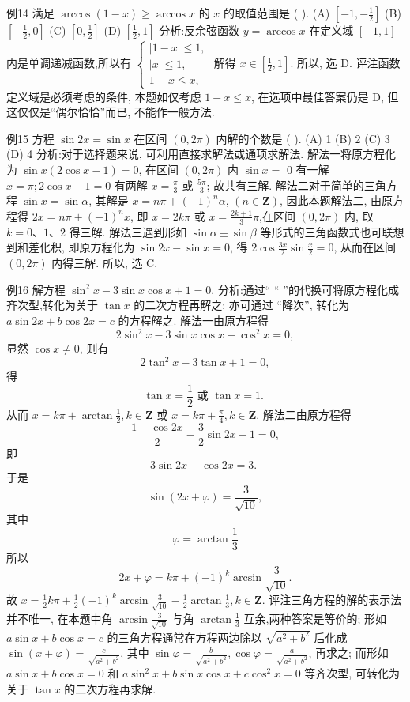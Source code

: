 例14 满足 $\arccos (1-x) \geqslant \arccos x$ 的 $x$ 的取值范围是 ( ).
(A) $\left[-1,-\frac{1}{2}\right]$
(B) $\left[-\frac{1}{2}, 0\right]$
(C) $\left[0, \frac{1}{2}\right]$
(D) $\left[\frac{1}{2}, 1\right]$
分析:反余弦函数 $y=\arccos x$ 在定义域 $[-1,1]$ 内是单调递减函数,所以有 $\left\{\begin{array}{l}|1-x| \leqslant 1, \\ |x| \leqslant 1, \\ 1-x \leqslant x,\end{array}\right.$ 解得 $x \in\left[\frac{1}{2}, 1\right]$.
所以, 选 D.
评注函数定义域是必须考虑的条件, 本题如仅考虑 $1-x \leqslant x$, 在选项中最佳答案仍是 $\mathrm{D}$, 但这仅仅是“偶尔恰恰”而已, 不能作一般方法.



例15 方程 $\sin 2 x=\sin x$ 在区间 $(0,2 \pi)$ 内解的个数是 ( ).
(A) 1
(B) 2
(C) 3
(D) 4
分析:对于选择题来说, 可利用直接求解法或通项求解法.
解法一将原方程化为 $\sin x(2 \cos x-1)=0$, 在区间 $(0,2 \pi)$ 内 $\sin x=$ 0 有一解 $x=\pi ; 2 \cos x-1=0$ 有两解 $x=\frac{\pi}{3}$ 或 $\frac{5 \pi}{3}$; 故共有三解.
解法二对于简单的三角方程 $\sin x=\sin \alpha$, 其解是 $x=n \pi+(-1)^n \alpha$, $(n \in \mathbf{Z})$, 因此本题解法二, 由原方程得 $2 x=n \pi+(-1)^n x$, 即 $x=2 k \pi$ 或 $x= \frac{2 k+1}{3} \pi$,在区间 $(0,2 \pi)$ 内, 取 $k=0 、 1 、 2$ 得三解.
解法三遇到形如 $\sin \alpha \pm \sin \beta$ 等形式的三角函数式也可联想到和差化积, 即原方程化为 $\sin 2 x-\sin x=0$, 得 $2 \cos \frac{3 x}{2} \sin \frac{x}{2}=0$, 从而在区间 $(0,2 \pi)$ 内得三解.
所以, 选 C.



例16 解方程 $\sin ^2 x-3 \sin x \cos x+1=0$.
分析:通过“ “ ”的代换可将原方程化成齐次型,转化为关于 $\tan x$ 的二次方程再解之; 亦可通过 “降次”, 转化为 $a \sin 2 x+b \cos 2 x=c$ 的方程解之.
解法一由原方程得
$$
2 \sin ^2 x-3 \sin x \cos x+\cos ^2 x=0,
$$
显然 $\cos x \neq 0$, 则有
$$
2 \tan ^2 x-3 \tan x+1=0,
$$
得
$$
\tan x=\frac{1}{2} \text { 或 } \tan x=1 \text {. }
$$
从而 $x=k \pi+\arctan \frac{1}{2}, k \in \mathbf{Z}$ 或 $x=k \pi+\frac{\pi}{4}, k \in \mathbf{Z}$.
解法二由原方程得
$$
\frac{1-\cos 2 x}{2}-\frac{3}{2} \sin 2 x+1=0,
$$
即
$$
3 \sin 2 x+\cos 2 x=3 \text {. }
$$
于是
$$
\sin (2 x+\varphi)=\frac{3}{\sqrt{10}},
$$
其中
$$
\varphi=\arctan \frac{1}{3}
$$
所以
$$
2 x+\varphi=k \pi+(-1)^k \arcsin \frac{3}{\sqrt{10}} .
$$
故 $x=\frac{1}{2} k \pi+\frac{1}{2}(-1)^k \arcsin \frac{3}{\sqrt{10}}-\frac{1}{2} \arctan \frac{1}{3}, k \in \mathbf{Z}$.
评注三角方程的解的表示法并不唯一, 在本题中角 $\arcsin \frac{3}{\sqrt{10}}$ 与角 $\arctan \frac{1}{3}$ 互余,两种答案是等价的; 形如 $a \sin x+b \cos x=c$ 的三角方程通常在方程两边除以 $\sqrt{a^2+b^2}$ 后化成 $\sin (x+\varphi)=\frac{c}{\sqrt{a^2+b^2}}$, 其中 $\sin \varphi= \frac{b}{\sqrt{a^2+b^2}}, \cos \varphi=\frac{a}{\sqrt{a^2+b^2}}$, 再求之; 而形如 $a \sin x+b \cos x=0$ 和
$a \sin ^2 x+b \sin x \cos x+c \cos ^2 x=0$ 等齐次型, 可转化为关于 $\tan x$ 的二次方程再求解.



